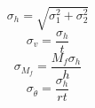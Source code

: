 \[\displaystyle \sigma_{h} = \sqrt{\sigma_{1}^{2} + \sigma_{2}^{2}}\]
\[\displaystyle \sigma_{v} = \frac{\sigma_{h}}{t}\]
\[\displaystyle \sigma_{M_f} = \frac{M_{f} \sigma_{h}}{h}\]
\[\displaystyle \sigma_{\dot{\theta}} = \frac{\sigma_{h}}{r t}\]
